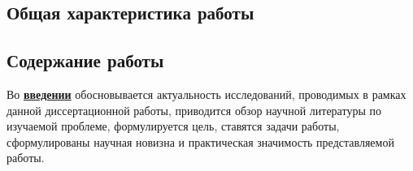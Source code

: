 \subsection*{Общая характеристика работы}

\newcommand{\actuality}{\underline{\textbf{Актуальность темы.}}}
\newcommand{\aim}{\underline{\textbf{Целью}}}
\newcommand{\tasks}{\underline{\textbf{задачи}}}
\newcommand{\defpositions}{\underline{\textbf{Основные положения, выносимые на~защиту:}}}
\newcommand{\novelty}{\underline{\textbf{Научная новизна:}}}
\newcommand{\influence}{\underline{\textbf{Практическая значимость}}}
\newcommand{\reliability}{\underline{\textbf{Достоверность}}}
\newcommand{\probation}{\underline{\textbf{Апробация работы.}}}
\newcommand{\contribution}{\underline{\textbf{Личный вклад.}}}
\newcommand{\publications}{\underline{\textbf{Публикации.}}}




\subsection*{Содержание работы}
Во \underline{\textbf{введении}} обосновывается актуальность
исследований, проводимых в рамках данной диссертационной работы,
приводится обзор научной литературы по изучаемой проблеме,
формулируется цель, ставятся задачи работы, сформулированы научная
новизна и практическая значимость представляемой работы.

